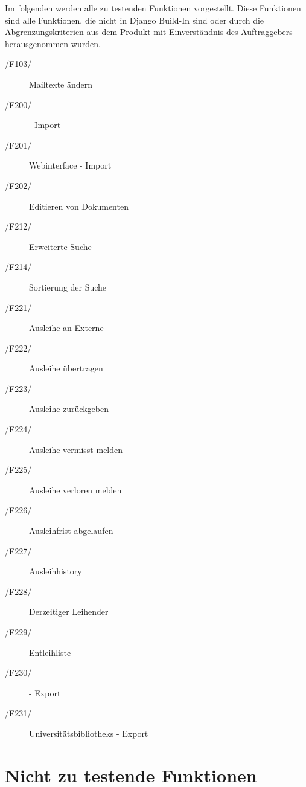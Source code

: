 Im folgenden werden alle zu testenden Funktionen vorgestellt. Diese Funktionen
sind alle Funktionen, die nicht in Django Build-In sind oder durch die
Abgrenzungskriterien aus dem Produkt mit Einverständnis des Auftraggebers
herausgenommen wurden.

\begin{description}
\item[/F103/] Mailtexte ändern %
\item[/F200/] \BibTex - Import %
\item[/F201/] Webinterface - Import %
\item[/F202/] Editieren von Dokumenten %
\item[/F212/] Erweiterte Suche %
\item[/F214/] Sortierung der Suche %
\item[/F221/] Ausleihe an Externe %
\item[/F222/] Ausleihe übertragen %
\item[/F223/] Ausleihe zurückgeben %
\item[/F224/] Ausleihe vermisst melden %
\item[/F225/] Ausleihe verloren melden %
\item[/F226/] Ausleihfrist abgelaufen %
\item[/F227/] Ausleihhistory %
\item[/F228/] Derzeitiger Leihender %
\item[/F229/] Entleihliste %
\item[/F230/] \BibTex - Export %
\item[/F231/] Universitätsbibliotheks - Export %
\end{description}

\section{Nicht zu testende Funktionen}



